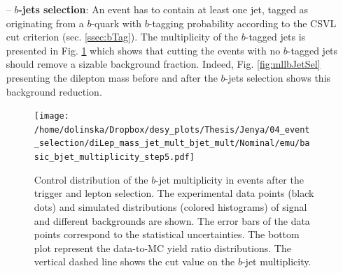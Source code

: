\begin{itemize}
%  
 \item [--] \textbf{$b$-jets selection}: An event has to contain at least one jet, tagged as originating from a $b$-quark with $b$-tagging probability according to the CSVL cut criterion (sec. \ref{ssec:bTag}). 
 The multiplicity of the $b$-tagged jets is presented in Fig. \ref{fig:bjetMultiSel} which shows that cutting the events with no $b$-tagged jets should remove a sizable background fraction. 
 Indeed, Fig. \ref{fig:mllbJetSel} presenting the dilepton mass before and after the $b$-jets selection shows this background reduction.
 
 \begin{figure}[h]
  \centering
  \texttt{[image: /home/dolinska/Dropbox/desy\_plots/Thesis/Jenya/04\_event\_selection/diLep\_mass\_jet\_mult\_bjet\_mult/Nominal/emu/basic\_bjet\_multiplicity\_step5.pdf]}
  \caption{Control distribution of the $b$-jet multiplicity in events after the trigger and lepton selection. The experimental data points (black dots)
  and simulated distributions (colored histograms) of signal and different backgrounds are shown. The error bars of the data points
 correspond to the statistical uncertainties. The bottom plot represent the data-to-MC yield ratio distributions. The vertical dashed line shows the cut value on the $b$-jet multiplicity.}
  \label{fig:bjetMultiSel}
  \end{figure}
  

\end{itemize}
